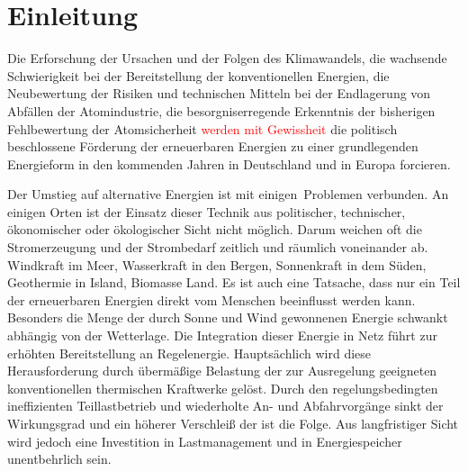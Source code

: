 \chapter{Einleitung}
\label{chap:einleitung}

%

Die Erforschung der Ursachen und der
Folgen des Klimawandels, die wachsende Schwierigkeit bei der Bereitstellung der
konventionellen Energien, die Neubewertung der Risiken und technischen Mitteln
bei der Endlagerung von Abfällen der Atomindustrie, die besorgniserregende
Erkenntnis der bisherigen Fehlbewertung der Atomsicherheit
\textcolor{red}{werden mit Gewissheit} die politisch beschlossene Förderung der
erneuerbaren Energien zu einer grundlegenden Energieform in den kommenden Jahren
in Deutschland und in Europa forcieren.

Der Umstieg auf alternative Energien ist mit einigen$\,$ Problemen verbunden. An einigen Orten ist der Einsatz dieser
Technik aus politischer, technischer, ökonomischer oder ökologischer Sicht nicht
möglich. Darum weichen oft die Stromerzeugung und der Strombedarf zeitlich und
räumlich voneinander ab. Windkraft im Meer, Wasserkraft in den Bergen,
Sonnenkraft in dem Süden, Geothermie in Island, Biomasse Land. Es ist auch eine Tatsache, dass nur ein Teil der
erneuerbaren Energien direkt vom Menschen beeinflusst werden kann. Besonders die
Menge der durch Sonne und Wind gewonnenen Energie schwankt abhängig von der
Wetterlage. Die Integration dieser Energie in Netz führt zur erhöhten
Bereitstellung an Regelenergie. Hauptsächlich wird diese Herausforderung durch
übermäßige Belastung der zur Ausregelung geeigneten konventionellen thermischen
Kraftwerke gelöst. Durch den regelungsbedingten ineffizienten Teillastbetrieb
und wiederholte An- und Abfahrvorgänge sinkt der Wirkungsgrad und ein höherer
Verschleiß der ist die Folge.  Aus langfristiger Sicht wird
jedoch eine
Investition in Lastmanagement und in Energiespeicher unentbehrlich sein.

